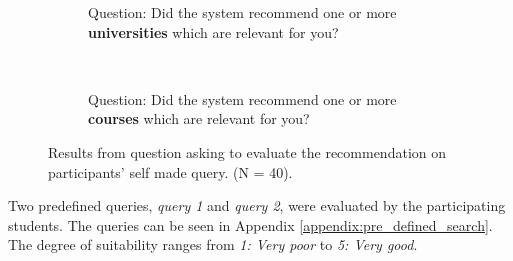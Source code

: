\begin{figure}[H]
    \centering
    \begin{subfigure}[b]{0.4\textwidth}
        
        \caption{Question: Did the system recommend one or more \textbf{universities} which are relevant for you?}
        \label{fig:free_search_results_p1}
    \end{subfigure}
    ~ \qquad %
    \begin{subfigure}[b]{0.4\textwidth}
       
        \caption{Question: Did the system recommend one or more \textbf{courses} which are relevant for you?}
        \label{fig:free_search_results_p2}
    \end{subfigure}
    \caption[Result from evaluation of recommendation]{Results from question asking to evaluate the recommendation on participants' self made query. (N = 40).}
    \label{fig:free_search_results}
\end{figure}

Two predefined queries, \textit{query 1} and \textit{query 2}, were evaluated by the participating students. The queries can be seen in Appendix \ref{appendix:pre_defined_search}. The degree of suitability ranges from \textit{1: Very poor} to \textit{5: Very good}.

